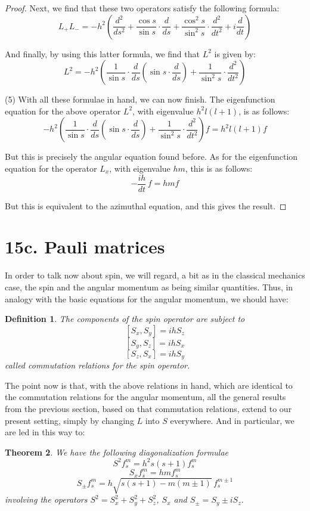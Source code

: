 \documentclass[12pt]{amsbook}
\newtheorem{theorem}{Theorem}[chapter]
\newtheorem{definition}[theorem]{Definition}
\begin{document}
\begin{proof}
Next, we find that these two operators satisfy the following formula:
$$L_+L_-=-h^2\left(\frac{d^2}{ds^2}+\frac{\cos s}{\sin s}\cdot\frac{d}{ds}+\frac{\cos^2s}{\sin^2s}\cdot\frac{d^2}{dt^2}+i\frac{d}{dt}\right)$$

And finally, by using this latter formula, we find that $L^2$ is given by:
$$L^2=-h^2\left(\frac{1}{\sin s}\cdot\frac{d}{ds}\left(\sin s\cdot\frac{d}{ds}\right)+\frac{1}{\sin^2s}\cdot\frac{d^2}{dt^2}\right)$$

(5) With all these formulae in hand, we can now finish. The eigenfunction equation for the above operator $L^2$, with eigenvalue $h^2l(l+1)$, is as follows:
$$-h^2\left(\frac{1}{\sin s}\cdot\frac{d}{ds}\left(\sin s\cdot\frac{d}{ds}\right)+\frac{1}{\sin^2s}\cdot\frac{d^2}{dt^2}\right)f=h^2l(l+1)f$$

But this is precisely the angular equation found before. As for the eigenfunction equation for the operator $L_x$, with eigenvalue $hm$, this is as follows:
$$-\frac{ih}{dt}\,f=hmf$$

But this is equivalent to the azimuthal equation, and this gives the result.
\end{proof}

\section*{15c. Pauli matrices}

In order to talk now about spin, we will regard, a bit as in the classical mechanics case, the spin and the angular momentum as being similar quantities. Thus, in analogy with the basic equations for the angular momentum, we should have:

\begin{definition}
The components of the spin operator are subject to
$$[S_x,S_y]=ihS_z$$
$$[S_y,S_z]=ihS_x$$
$$[S_z,S_x]=ihS_y$$
called commutation relations for the spin operator.
\end{definition}

The point now is that, with the above relations in hand, which are identical to the commutation relations for the angular momentum, all the general results from the previous  section, based on that commutation relations, extend to our present setting, simply by changing $L$ into $S$ everywhere. And in particular, we are led in this way to:

\begin{theorem}
We have the following diagonalization formulae
$$S^2f_s^m=h^2s(s+1)f_s^m$$
$$S_xf_s^m=hmf_s^m$$
$$S_\pm f_s^m=h\sqrt{s(s+1)-m(m\pm1)}\,f_s^{m\pm1}$$
involving the operators $S^2=S_x^2+S_y^2+S_z^2$, $S_x$ and $S_\pm=S_y\pm iS_z$.
\end{theorem}
\end{document}
